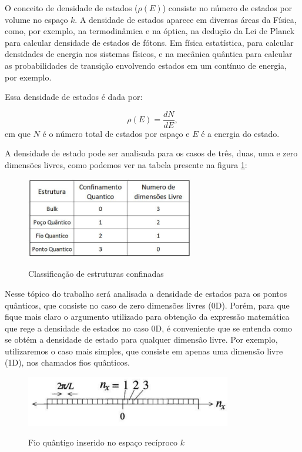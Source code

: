 \par O conceito de densidade de estados ($\rho(E)$) consiste no número de estados por volume no espaço $k$. A densidade de estados aparece em diversas áreas da Física, como, por exemplo, na termodinâmica e na óptica, na dedução da Lei de Planck para calcular densidade de estados de fótons. Em física estatística, para calcular densidades de energia nos sistemas físicos, e na mecânica quântica para calcular as probabilidades de transição envolvendo estados em um contínuo de energia, por exemplo\cite{confinamento2}.

\par Essa densidade de estados é dada por:

\begin{equation}
	\label{confinamento_2}
	\rho(E) = \frac{dN}{dE},
\end{equation}
em que $N$ é o número total de estados por espaço e $E$ é a energia do estado.

\par A densidade de estado pode ser analisada para os casos de três, duas, uma e zero dimensões livres, como podemos ver na tabela presente na figura \ref{fig10}:

\begin{figure}[H]
  \caption{Classificação de estruturas confinadas}
  \centering
  \includegraphics[width=0.65\textwidth]{images/figura10.jpg}
  \label{fig10}
\end{figure}

\par Nesse tópico do trabalho será analisada a densidade de estados para os pontos quânticos, que consiste no caso de zero dimensões livres (0D). Porém, para que fique mais claro o argumento utilizado para obtenção da expressão matemática que rege a densidade de estados no caso 0D, é conveniente que se entenda como se obtém a densidade de estado para qualquer dimensão livre. Por exemplo, utilizaremos o caso mais simples, que consiste em apenas uma dimensão livre (1D), nos chamados fios quânticos.

\begin{figure}[H]
  \caption{Fio quântigo inserido no espaço recíproco $k$}
  \centering
  \includegraphics[width=0.8\textwidth]{images/figura11.jpg}
  \label{fig11}
\end{figure}


